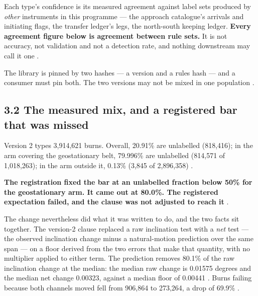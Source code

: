 \documentclass[11pt]{article}
\begin{document}
Each type's confidence is its measured agreement against label sets produced by \emph{other} instruments in this programme --- the approach catalogue's arrivals and initiating flags, the transfer ledger's legs, the north-south keeping ledger. \textbf{Every agreement figure below is agreement between rule sets.} It is not accuracy, not validation and not a detection rate, and nothing downstream may call it one%
.

The library is pinned by two hashes --- a version and a rules hash --- and a consumer must pin both. The two versions may not be mixed in one population%
.

\subsection*{3.2 The measured mix, and a registered bar that was missed}

Version 2 types 3,914,621 burns. Overall, 20.91\% are unlabelled (818,416); in the arm covering the geostationary belt, 79.996\% are unlabelled (814,571 of 1,018,263); in the arm outside it, 0.13\% (3,845 of 2,896,358)%
.

\textbf{The registration fixed the bar at an unlabelled fraction below 50\% for the geostationary arm. It came out at 80.0\%. The registered expectation failed, and the clause was not adjusted to reach it}%
.

The change nevertheless did what it was written to do, and the two facts sit together. The version-2 clause replaced a raw inclination test with a \emph{net} test --- the observed inclination change minus a natural-motion prediction over the same span --- on a floor derived from the two errors that make that quantity, with no multiplier applied to either term. The prediction removes 80.1\% of the raw inclination change at the median: the median raw change is 0.01575 degrees and the median net change 0.00323, against a median floor of 0.00441%
. Burns failing because both channels moved fell from 906,864 to 273,264, a drop of 69.9\%%
.
\end{document}
